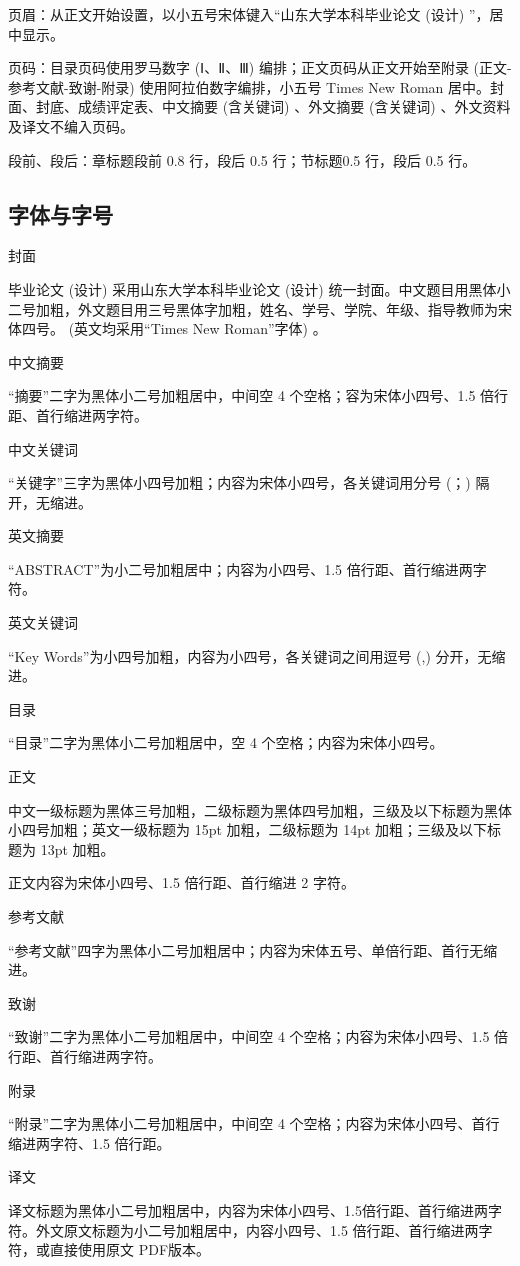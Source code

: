 页眉：从正文开始设置，以小五号宋体键入“山东大学本科毕业论文 (设计) ”，居中显示。

页码：目录页码使用罗马数字 (Ⅰ、Ⅱ、Ⅲ) 编排；正文页码从正文开始至附录 (正文-参考文献-致谢-附录) 使用阿拉伯数字编排，小五号 Times New Roman 居中。封面、封底、成绩评定表、中文摘要 (含关键词) 、外文摘要 (含关键词) 、外文资料及译文不编入页码。

段前、段后：章标题段前 0.8 行，段后 0.5 行；节标题0.5 行，段后 0.5 行。
\subsection{字体与字号}
\begin{compactenum}
\item 封面

毕业论文 (设计) 采用山东大学本科毕业论文 (设计) 统一封面。中文题目用黑体小二号加粗，外文题目用三号黑体字加粗，姓名、学号、学院、年级、指导教师为宋体四号。 (英文均采用“Times New Roman”字体) 。
\item 中文摘要

“摘要”二字为黑体小二号加粗居中，中间空 4 个空格；容为宋体小四号、1.5 倍行距、首行缩进两字符。
\item 中文关键词

“关键字”三字为黑体小四号加粗；内容为宋体小四号，各关键词用分号 (；) 隔开，无缩进。
\item 英文摘要

“ABSTRACT”为小二号加粗居中；内容为小四号、1.5 倍行距、首行缩进两字符。
\item 英文关键词

“Key Words”为小四号加粗，内容为小四号，各关键词之间用逗号 (,) 分开，无缩进。
\item 目录

“目录”二字为黑体小二号加粗居中，空 4 个空格；内容为宋体小四号。
\item 正文

中文一级标题为黑体三号加粗，二级标题为黑体四号加粗，三级及以下标题为黑体小四号加粗；英文一级标题为 15pt 加粗，二级标题为 14pt 加粗；三级及以下标题为 13pt 加粗。

正文内容为宋体小四号、1.5 倍行距、首行缩进 2 字符。
\item 参考文献

“参考文献”四字为黑体小二号加粗居中；内容为宋体五号、单倍行距、首行无缩进。
\item 致谢

“致谢”二字为黑体小二号加粗居中，中间空 4 个空格；内容为宋体小四号、1.5 倍行距、首行缩进两字符。
\item 附录

“附录”二字为黑体小二号加粗居中，中间空 4 个空格；内容为宋体小四号、首行缩进两字符、1.5 倍行距。
\item 译文

译文标题为黑体小二号加粗居中，内容为宋体小四号、1.5倍行距、首行缩进两字符。外文原文标题为小二号加粗居中，内容小四号、1.5 倍行距、首行缩进两字符，或直接使用原文 PDF版本。
\end{compactenum}
